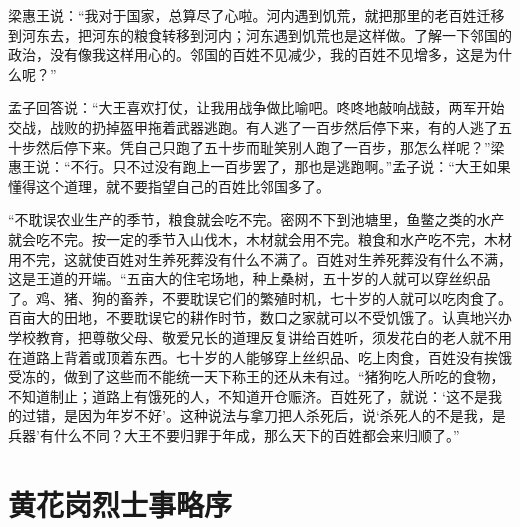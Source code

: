 \documentclass[12pt,UTF-8,openany,a4]{ctexbook}
\begin{document}
\vspace{1em}

\begin{large}
    \yiwen 
    梁惠王说：“我对于国家，总算尽了心啦。河内遇到饥荒，就把那里的老百姓迁移到河东去，把河东的粮食转移到河内；河东遇到饥荒也是这样做。了解一下邻国的政治，没有像我这样用心的。邻国的百姓不见减少，我的百姓不见增多，这是为什么呢？”
    
    孟子回答说：“大王喜欢打仗，让我用战争做比喻吧。咚咚地敲响战鼓，两军开始交战，战败的扔掉盔甲拖着武器逃跑。有人逃了一百步然后停下来，有的人逃了五十步然后停下来。凭自己只跑了五十步而耻笑别人跑了一百步，那怎么样呢？”梁惠王说：“不行。只不过没有跑上一百步罢了，那也是逃跑啊。”孟子说：“大王如果懂得这个道理，就不要指望自己的百姓比邻国多了。
    
    “不耽误农业生产的季节，粮食就会吃不完。密网不下到池塘里，鱼鳖之类的水产就会吃不完。按一定的季节入山伐木，木材就会用不完。粮食和水产吃不完，木材用不完，这就使百姓对生养死葬没有什么不满了。百姓对生养死葬没有什么不满，这是王道的开端。“五亩大的住宅场地，种上桑树，五十岁的人就可以穿丝织品了。鸡、猪、狗的畜养，不要耽误它们的繁殖时机，七十岁的人就可以吃肉食了。百亩大的田地，不要耽误它的耕作时节，数口之家就可以不受饥饿了。认真地兴办学校教育，把尊敬父母、敬爱兄长的道理反复讲给百姓听，须发花白的老人就不用在道路上背着或顶着东西。七十岁的人能够穿上丝织品、吃上肉食，百姓没有挨饿受冻的，做到了这些而不能统一天下称王的还从未有过。“猪狗吃人所吃的食物，不知道制止；道路上有饿死的人，不知道开仓赈济。百姓死了，就说：‘这不是我的过错，是因为年岁不好’。这种说法与拿刀把人杀死后，说‘杀死人的不是我，是兵器’有什么不同？大王不要归罪于年成，那么天下的百姓都会来归顺了。”
    
\end{large}



\chapter{黄花岗烈士事略序}
\end{document}
